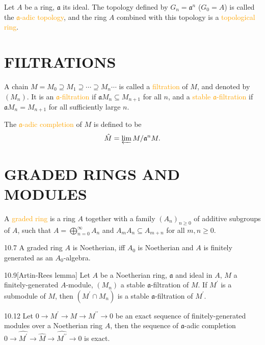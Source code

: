 \bigskip

Let $A$ be a ring, $\mathfrak{a}$ its ideal. The topology defined by $G_n=\mathfrak{a}^n$ ($G_0=A$) is called the \textcolor{orange}{$\mathfrak{a}$-adic topology}, and the ring $A$ combined with this topology is a \textcolor{orange}{topological ring}.

\section*{FILTRATIONS}

A chain $M=M_0\supseteq M_1\supseteq\cdots\supseteq M_n\cdots$ is called a \textcolor{orange}{filtration} of $M$, and denoted by $\left(M_n\right)$. It is an \textcolor{orange}{$\mathfrak{a}$-filtration} if $\mathfrak{a}M_n\subseteq M_{n+1}$ for all $n$, and a \textcolor{orange}{stable $\mathfrak{a}$-filtration} if $\mathfrak{a}M_n=M_{n+1}$ for all sufficiently large $n$.

The \textcolor{orange}{$\mathfrak{a}$-adic completion} of $M$ is defined to be
\begin{equation*}
	\hat{M}=\varprojlim M/\mathfrak{a}^nM.
\end{equation*}

\section*{GRADED RINGS AND MODULES}

A \textcolor{orange}{graded ring} is a ring $A$ together with a family $\left(A_n\right)_{n\geqslant0}$ of additive subgroups of $A$, such that $A=\bigoplus_{n=0}^{\infty}A_n$ and $A_mA_n\subseteq A_{m+n}$ for all $m,n\geqslant0$.

\begin{proposition}{10.7}
	A graded ring $A$ is Noetherian, iff $A_0$ is Noetherian and $A$ is finitely generated as an $A_0$-algebra.
\end{proposition}

\begin{proposition}{10.9}[Artin-Rees lemma]
	Let $A$ be a Noetherian ring, $\mathfrak{a}$ and ideal in $A$, $M$ a finitely-generated $A$-module, $\left(M_n\right)$ a stable $\mathfrak{a}$-filtration of $M$. If $M^\prime$ is a submodule of $M$, then $\left(M^\prime\cap M_n\right)$ is a stable $\mathfrak{a}$-filtration of $M^\prime$.
\end{proposition}

\begin{proposition}{10.12}
	Let $0\rightarrow M^\prime\rightarrow M\rightarrow M^{\prime\prime}\rightarrow0$ be an exact sequence of finitely-generated modules over a Noetherian ring $A$, then the sequence of $\mathfrak{a}$-adic completion $0\rightarrow\hat{M^\prime}\rightarrow\hat{M}\rightarrow\hat{M^{\prime\prime}}\rightarrow0$ is exact.
\end{proposition}


